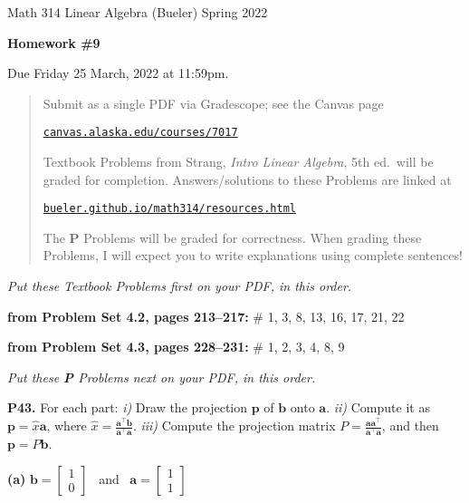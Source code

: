 \documentclass[12pt]{amsart}
\newcommand{\ba}{\bm{a}}
\newcommand{\bb}{\bm{b}}
\newcommand{\bp}{\bm{p}}
\newcommand{\ds}{\displaystyle}
\newcommand{\prob}[1]{\bigskip\noindent\textbf{#1.}\quad }
\newcommand{\probset}[2]{\bigskip\noindent\textbf{from Problem Set #1, pages #2:}\quad }
\newcommand{\epart}[1]{\medskip\noindent\textbf{(#1)}\quad }
\begin{document}
\scriptsize \noindent Math 314 Linear Algebra (Bueler) \hfill Spring 2022
\normalsize\medskip

\Large
\centerline{\textbf{Homework \#9}}

\bigskip
\large
\centerline{Due Friday 25 March, 2022 at 11:59pm.}

\normalsize
\bigskip
\begin{quote}
\medskip
\noindent Submit as a single PDF via Gradescope; see the Canvas page

\href{https://canvas.alaska.edu/courses/7017}{\texttt{canvas.alaska.edu/courses/7017}}

\noindent Textbook Problems from Strang, \emph{Intro Linear Algebra}, 5th ed.~will be graded for completion.  Answers/solutions to these Problems are linked at

\href{https://bueler.github.io/math314/resources.html}{\texttt{bueler.github.io/math314/resources.html}}

\noindent The \textbf{P} Problems will be graded for correctness.  When grading these Problems, I will expect you to write explanations using complete sentences!
\end{quote}
\medskip

\thispagestyle{empty}

\noindent \hrulefill

\noindent \emph{Put these Textbook Problems first on your PDF, in this order.}

\probset{4.2}{213--217} \# 1, 3, 8, 13, 16, 17, 21, 22

\probset{4.3}{228--231} \# 1, 2, 3, 4, 8, 9


\bigskip
\noindent \hrulefill

\noindent \emph{Put these \textbf{P} Problems next on your PDF, in this order.}

\prob{P43}  For each part: \emph{i)} Draw the projection $\bp$ of $\bb$ onto $\ba$.  \emph{ii)} Compute it as $\bp = \hat x \ba$, where $\ds \hat x = \frac{\ba^\top \bb}{\ba^\top \ba}$.  \emph{iii)} Compute the projection matrix $\ds P = \frac{\ba \ba^\top}{\ba^\top \ba}$, and then $\bp = P\bb$.

\epart{a}  $\ds \bb = \begin{bmatrix} 1 \\ 0 \end{bmatrix}$ \, and \, $\ds \ba = \begin{bmatrix} 1 \\ 1 \end{bmatrix}$
\end{document}
